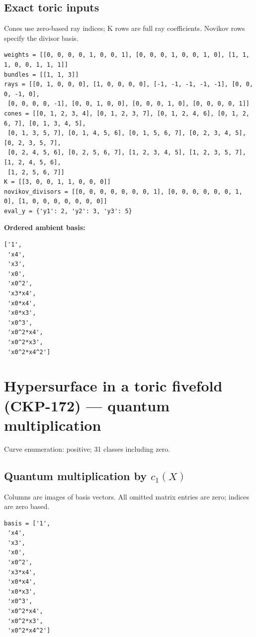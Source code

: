 \documentclass[10pt,a4paper]{article}
\begin{document}
\subsection*{Exact toric inputs}
Cones use zero-based ray indices; K rows are full ray coefficients. Novikov rows specify the divisor basis.

\begin{lstlisting}
weights = [[0, 0, 0, 0, 1, 0, 0, 1], [0, 0, 0, 1, 0, 0, 1, 0], [1, 1, 1, 0, 0, 1, 1, 1]]
bundles = [[1, 1, 3]]
rays = [[0, 1, 0, 0, 0], [1, 0, 0, 0, 0], [-1, -1, -1, -1, -1], [0, 0, 0, -1, 0],
 [0, 0, 0, 0, -1], [0, 0, 1, 0, 0], [0, 0, 0, 1, 0], [0, 0, 0, 0, 1]]
cones = [[0, 1, 2, 3, 4], [0, 1, 2, 3, 7], [0, 1, 2, 4, 6], [0, 1, 2, 6, 7], [0, 1, 3, 4, 5],
 [0, 1, 3, 5, 7], [0, 1, 4, 5, 6], [0, 1, 5, 6, 7], [0, 2, 3, 4, 5], [0, 2, 3, 5, 7],
 [0, 2, 4, 5, 6], [0, 2, 5, 6, 7], [1, 2, 3, 4, 5], [1, 2, 3, 5, 7], [1, 2, 4, 5, 6],
 [1, 2, 5, 6, 7]]
K = [[3, 0, 0, 1, 1, 0, 0, 0]]
novikov_divisors = [[0, 0, 0, 0, 0, 0, 0, 1], [0, 0, 0, 0, 0, 0, 1, 0], [1, 0, 0, 0, 0, 0, 0, 0]]
eval_y = {'y1': 2, 'y2': 3, 'y3': 5}
\end{lstlisting}

\textbf{Ordered ambient basis:}
\begin{lstlisting}
['1',
 'x4',
 'x3',
 'x0',
 'x0^2',
 'x3*x4',
 'x0*x4',
 'x0*x3',
 'x0^3',
 'x0^2*x4',
 'x0^2*x3',
 'x0^2*x4^2']
\end{lstlisting}

\clearpage\section*{Hypersurface in a toric fivefold (CKP-172) --- quantum multiplication}

Curve enumeration: positive; 31 classes including zero.
\subsection*{Quantum multiplication by $c_1(X)$}
Columns are images of basis vectors. All omitted matrix entries are zero; indices are zero based.

\begin{lstlisting}
basis = ['1',
 'x4',
 'x3',
 'x0',
 'x0^2',
 'x3*x4',
 'x0*x4',
 'x0*x3',
 'x0^3',
 'x0^2*x4',
 'x0^2*x3',
 'x0^2*x4^2']
\end{lstlisting}
\end{document}
